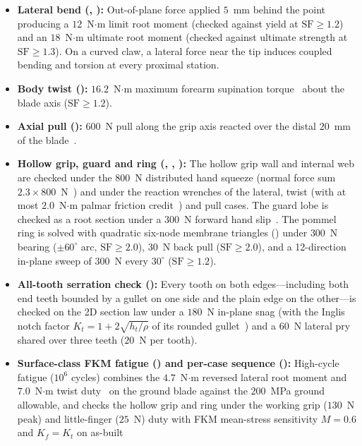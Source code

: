 \begin{itemize}
\item \textbf{Lateral bend (, ):} Out-of-plane force applied $5$~mm behind the
point producing a $12$~N$\cdot$m limit root moment (checked against yield at $\mathrm{SF} \ge 1.2$) and an $18$~N$\cdot$m
ultimate root moment (checked against ultimate strength at $\mathrm{SF} \ge 1.3$). On a curved claw, a lateral force near the
tip induces coupled bending and torsion at every proximal station.
\item \textbf{Body twist ():} $16.2$~N$\cdot$m maximum forearm supination torque~\cite{osullivan2002}
about the blade axis ($\mathrm{SF} \ge 1.2$).
\item \textbf{Axial pull ():} $600$~N pull along the grip axis reacted over the distal $20$~mm of the blade~\cite{hidh}.
\item \textbf{Hollow grip, guard and ring (, , ):} The hollow grip wall
and internal web are checked under the $800$~N distributed hand squeeze (normal force sum $2.3\times 800$~N~\cite{seo2008hf})
and under the reaction wrenches of the lateral, twist (with at most $2.0$~N$\cdot$m palmar friction credit~\cite{seo2011,buchholz1988})
and pull cases. The guard lobe is checked as a root section under a $300$~N forward hand slip~\cite{cochran1986}. The pommel
ring is solved with quadratic six-node membrane triangles () under $300$~N bearing ($\pm 60^\circ$ arc,
$\mathrm{SF} \ge 2.0$), $30$~N back pull ($\mathrm{SF} \ge 2.0$), and a 12-direction in-plane sweep of $300$~N every $30^\circ$
($\mathrm{SF} \ge 1.2$).
\item \textbf{All-tooth serration check ():} Every tooth on both edges---including both end teeth bounded by a
gullet on one side and the plain edge on the other---is checked on the 2D section law under a $180$~N in-plane snag (with the
Inglis notch factor $K_t = 1 + 2\sqrt{h_t/\rho}$ of its rounded gullet~\cite{inglis1913}) and a $60$~N lateral pry shared over
three teeth ($20$~N per tooth).
\item \textbf{Surface-class FKM fatigue () and per-case sequence ():} High-cycle fatigue ($10^6$
cycles) combines the $4.7$~N$\cdot$m reversed lateral root moment and $7.0$~N$\cdot$m twist duty~\cite{tirloni2021,mcgorry2005}
on the ground blade against the $200$~MPa ground allowable, and checks the hollow grip and ring under the working grip
($130$~N peak) and little-finger ($25$~N) duty with FKM mean-stress sensitivity $M = 0.6$ and $K_f = K_t$ on as-built

\end{itemize}
